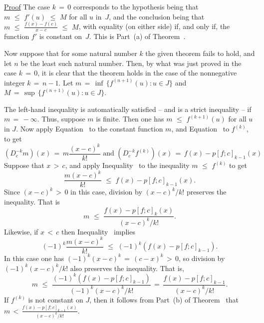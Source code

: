 {\V

        \underline{Proof} The case $k \,=\, 0$ corresponds to the hypothesis being that $m\,\,{\leq}\,\,f'(u)\,\,{\leq}\,\,M$ for all $u$ in~$J$,
    and the conclusion being that ${\displaystyle m\,\,{\leq}\,\,\frac{f(x) - f(c)}{x-c}\,\,{\leq}\,\,M}$,
    with equality (on either side) if, and only if, the function $f'$ is constant on~$J$. This is Part~(a) of Theorem~.

        Now suppose that for some natural number $k$ the given theorem fails to hold, and let $n$ be the least such natural number.
    Then, by what was just proved in the case $k \,=\, 0$, it is clear that the theorem holds in the case of the nonnegative integer $k \,=\, n-1$.
    Let $m \,=\, {\inf}\,\{f^{(n+1)}(u): u{\in}J\}$ and $M \,=\, {\sup}\,\{f^{(n+1)}(u): u{\in}J\}$.%

\V

        The left-hand inequality is automatically satisfied -- and is a strict inequality -- if $m \,=\, -{\infty}$.
    Thus, suppose $m$ is finite. Then one has $m\,\,{\leq}\,\,f^{(k+1)}(u)$ for all $u$ in $J$.
    Now apply Equation~ to the constant function $m$, and Equation~ to $f^{(k)}$, to get
        \begin{displaymath}
        \left(D^{-k}_{c} m\right)(x) \,=\, m\frac{(x-c)^{k}}{k!}
    \mbox{ and }
        \left(D^{-k}_{c} f^{(k)}\right)(x) \,=\, f(x) - p[f;c]_{k-1}(x)
        \end{displaymath}
    Suppose that $x\,>\,c$, and apply Inequality~ to the inequality $m\,\,{\leq}\,\,f^{(k)}$ to get
        \begin{displaymath}
        \frac{m(x-c)^{k}}{k!}\,\,{\leq}\,\,f(x)-p[f;c]_{k-1}(x).
        \end{displaymath}
    Since $(x-c)^{k}\,>\,0$ in this case, division by $(x-c)^{k}/k!$ preserves the inequality. That is
        \begin{displaymath}
        m\,\,{\leq}\,\,\frac{f(x)-p[f;c]_{k}(x)}{(x-c)^{k}/k!}.
        \end{displaymath}
    Likewise, if $x\,<\,c$ then Inequality~ implies
        \begin{displaymath}
        (-1)^{k}\frac{m(x-c)^{k}}{k!}\,\,{\leq}\,\,(-1)^{k}(f(x)-p[f;c]_{k-1}).
        \end{displaymath}
    In this case one has $(-1)^{k}(x-c)^{k} \,=\, (c-x)^{k}\,>\,0$, so division by $(-1)^{k}(x-c)^{k}/k!$ also preserves the inequality. That is,
        \begin{displaymath}
        m\,\,{\leq}\,\,\frac{(-1)^{k}(f(x)-p[f;c]_{k-1})}{(-1)^{k}(x-c)^{k}/k!} \,=\, \frac{f(x)-p[f;c]_{k-1}}{(x-c)^{k}/k!}.
        \end{displaymath}
    If $f^{(k)}$ is not constant on $J$, then it follows from Part~(b) of Theorem~ that ${\displaystyle m\,<\,\frac{f(x) - p[f;c]_{k-1}(x)}{(x-c)^{k}/k!}}$.

}
